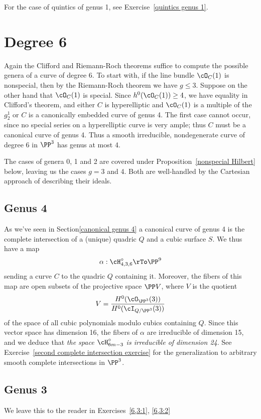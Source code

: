 For the case of quintics of genus 1, see Exercise~\ref{quintics genus 1}.

\section{Degree 6}

Again the Clifford and Riemann-Roch theorems suffice to compute the possible genera of a curve of degree 6. To start with,  if the line bundle $\cO_C(1)$ is nonspecial, then by the Riemann-Roch theorem we have $g \leq 3$. Suppose on the other hand that $\cO_C(1)$ is special. Since   $h^{0}(\cO_C(1)) \geq 4$, we have equality in Clifford's theorem, and either $C$ is hyperelliptic and $\cO_C(1)$ is a multiple of the $g^{1}_{2}$ or  $C$ is  a canonically embedded curve of genus 4. The first case cannot occur, since no special series on a hyperelliptic curve is very ample; thus $C$ must be a canonical curve of genus 4. Thus a smooth irreducible, nondegenerate curve of degree 6 in $\PP^3$ has genus at most 4.


The cases of genera 0, 1 and 2 are covered under Proposition~\ref{nonspecial Hilbert} below, leaving us the cases $g = 3$ and 4. Both are well-handled by the Cartesian approach of describing their ideals.

\subsection{Genus 4}

As we've seen in Section\ref{canonical genus 4} a canonical curve of genus 4 is the complete intersection of a (unique) quadric $Q$ and a cubic surface $S$. We thus have a map
$$
\alpha : \cH^\circ_{4,3,6} \rTo \PP^9
$$
sending a curve $C$ to the quadric $Q$ containing it. Moreover, the fibers of this map are open subsets of the projective space $\PP V$, where $V$ is the quotient
$$
V = \frac{H^0(\cO_{\PP^3}(3))}{H^0(\cI_{Q/\PP^3}(3))}
$$
of the space of all cubic polynomials modulo cubics containing $Q$. Since this vector space has dimension 16, the fibers of $\alpha$ are irreducible of dimension 15, and we deduce that \emph{the space $\cH^\circ_{6m-3}$ is irreducible of dimension 24}.
See Exercise~\ref{second complete intersection exercise} for the generalization to arbitrary smooth complete intersections in $\PP^3$.

\subsection{Genus 3}
We leave this to the reader in Exercises~\ref{6,3:1}, \ref{6,3:2}






